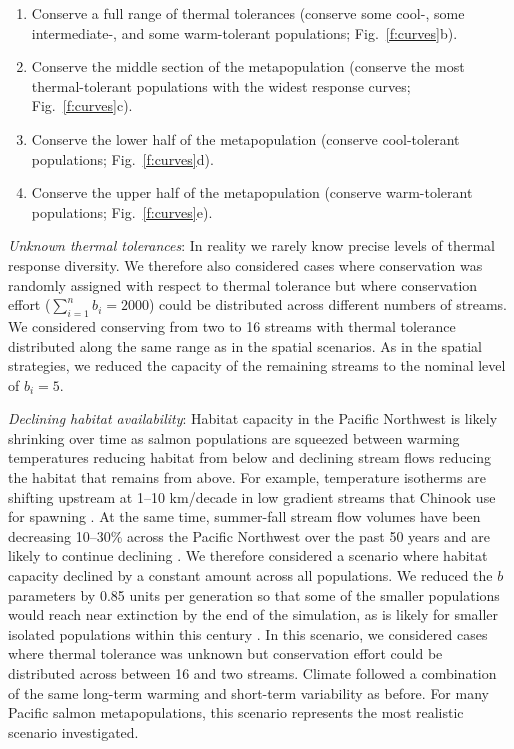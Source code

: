 \begin{enumerate}
\def\labelenumi{\arabic{enumi}.}
\item
  Conserve a full range of thermal tolerances (conserve some cool-, some intermediate-, and some warm-tolerant populations; Fig.~\ref{f:curves}b).
\item
  Conserve the middle section of the metapopulation (conserve the most thermal-tolerant populations with the widest response curves; Fig.~\ref{f:curves}c).
\item
  Conserve the lower half of the metapopulation (conserve cool-tolerant populations; Fig.~\ref{f:curves}d).
\item
  Conserve the upper half of the metapopulation (conserve warm-tolerant populations; Fig.~\ref{f:curves}e).
\end{enumerate}

\emph{Unknown thermal tolerances}: In reality we rarely know precise levels of thermal response diversity. We therefore also considered cases where conservation was randomly assigned with respect to thermal tolerance but where conservation effort ($\sum\limits_{i=1}^n b_i = 2000$) could be distributed across different numbers of streams. We considered conserving from two to 16 streams with thermal tolerance distributed along the same range as in the spatial scenarios. As in the spatial strategies, we reduced the capacity of the remaining streams to the nominal level of $b_i = 5$.

\emph{Declining habitat availability}: Habitat capacity in the Pacific Northwest is likely shrinking over time as salmon populations are squeezed between warming temperatures reducing habitat from below and declining stream flows reducing the habitat that remains from above. For example, temperature isotherms are shifting upstream at 1--10 km/decade in low gradient streams that Chinook use for spawning \citep{isaak2013}. At the same time, summer-fall stream flow volumes have been decreasing 10--30\% across the Pacific Northwest over the past 50 years \citep{luce2009} and are likely to continue declining \citep{luce2013}. We therefore considered a scenario where habitat capacity declined by a constant amount across all populations. We reduced the $b$ parameters by 0.85 units per generation so that some of the smaller populations would reach near extinction by the end of the simulation, as is likely for smaller isolated populations within this century \citep[e.g.][]{gustafson2007}. In this scenario, we considered cases where thermal tolerance was unknown but conservation effort could be distributed across between 16 and two streams. Climate followed a combination of the same long-term warming and short-term variability as before. For many Pacific salmon metapopulations, this scenario represents the most realistic scenario investigated.

